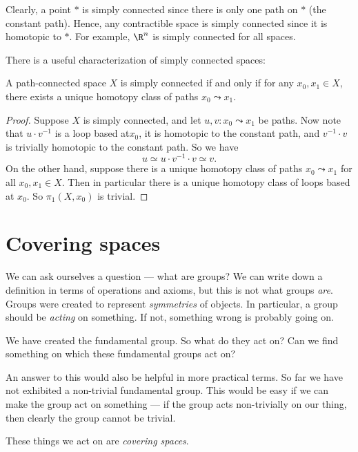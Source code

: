 \documentclass[a4paper]{article}
\begin{document}
\begin{eg}
  Clearly, a point $*$ is simply connected since there is only one path on $*$ (the constant path). Hence, any contractible space is simply connected since it is homotopic to $*$. For example, $\R^n$ is simply connected for all spaces.
\end{eg}

There is a useful characterization of simply connected spaces:
\begin{lemma}
  A path-connected space $X$ is simply connected if and only if for any $x_0, x_1\in X$, there exists a unique homotopy class of paths $x_0 \leadsto x_1$.
\end{lemma}

\begin{proof}
  Suppose $X$ is simply connected, and let $u, v: x_0 \leadsto x_1$ be paths. Now note that $u \cdot v^{-1}$ is a loop based at$x_0$, it is homotopic to the constant path, and $v^{-1} \cdot v$ is trivially homotopic to the constant path. So we have
  \[
    u \simeq u \cdot v^{-1} \cdot v \simeq v.
  \]
  On the other hand, suppose there is a unique homotopy class of paths $x_0 \leadsto x_1$ for all $x_0, x_1 \in X$. Then in particular there is a unique homotopy class of loops based at $x_0$. So $\pi_1(X, x_0)$ is trivial.
\end{proof}

\section{Covering spaces}
We can ask ourselves a question --- what are groups? We can write down a definition in terms of operations and axioms, but this is not what groups \emph{are}. Groups were created to represent \emph{symmetries} of objects. In particular, a group should be \emph{acting} on something. If not, something wrong is probably going on.

We have created the fundamental group. So what do they act on? Can we find something on which these fundamental groups act on?

An answer to this would also be helpful in more practical terms. So far we have not exhibited a non-trivial fundamental group. This would be easy if we can make the group act on something --- if the group acts non-trivially on our thing, then clearly the group cannot be trivial.

These things we act on are \emph{covering spaces}.
\end{document}

